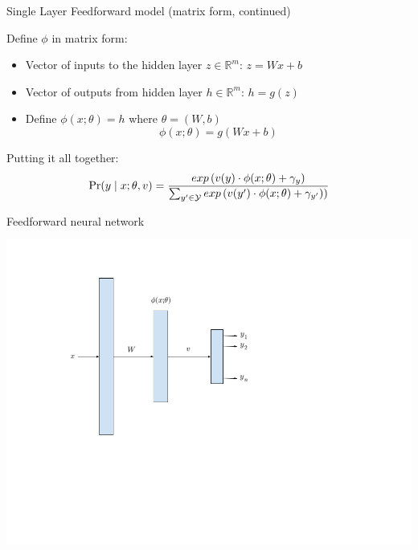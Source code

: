\begin{frame}{Single Layer Feedforward model (matrix form, continued)}
\begin{block}{Define $\phi$ in matrix form:}
\begin{itemize}[<+->]
\item Vector of inputs to the hidden layer $z \in \mathbb{R}^m$: $z = Wx + b$
\item Vector of outputs from hidden layer $h \in \mathbb{R}^m$: $h = g(z)$
\item Define $\phi(x; \theta) = h$ where $\theta = (W, b)$
\[ \phi(x; \theta) = g(Wx + b) \]
\end{itemize}
\end{block}
\pause
\begin{block}{Putting it all together:}
\[ \Pr(y \mid x; \theta, v) = \frac{exp\left(v(y) \cdot \phi(x;\theta) + \gamma_y \right)}{\sum_{y' \in {\cal Y}} exp\left(v(y') \cdot \phi(x;\theta) + \gamma_{y'})\right)} \]
\end{block}

\end{frame}

\begin{frame}{Feedforward neural network}
\begin{block}{}
\centering
\includegraphics[scale=0.4]{figures/ffnet.png}
\end{block}
\end{frame}

